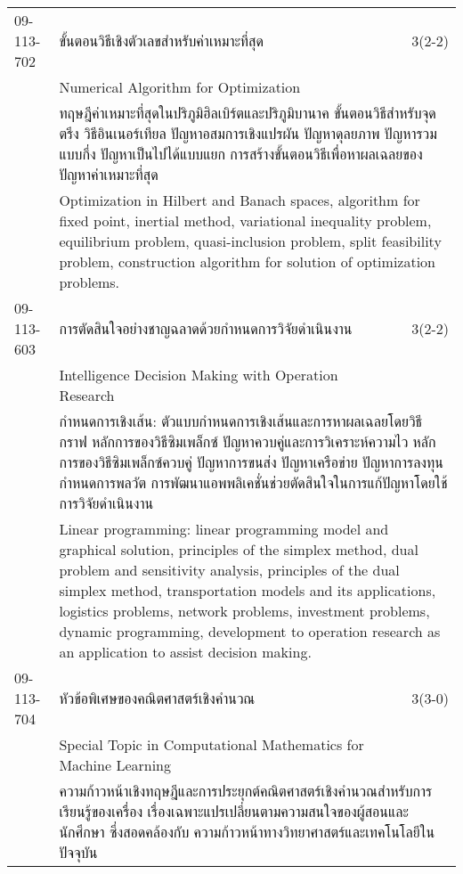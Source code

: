 \begin{longtable}{p{}p{}r{}}
09-113-702 & ขั้นตอนวิธีเชิงตัวเลขสำหรับค่าเหมาะที่สุด  & 3(2-2)\\*
 & Numerical Algorithm for Optimization & \phantom{x} \vspace{3mm} \\*
&  \multicolumn{2}{p{0.75\textwidth}}{ทฤษฎีค่าเหมาะที่สุดในปริภูมิฮิลเบิร์ตและปริภูมิบานาค ขั้นตอนวิธีสำหรับจุดตรึง วิธีอินเนอร์เทียล ปัญหาอสมการเชิงแปรผัน ปัญหาดุลยภาพ ปัญหารวมแบบกึ่ง ปัญหาเป็นไปได้แบบแยก การสร้างขั้นตอนวิธีเพื่อหาผลเฉลยของปัญหาค่าเหมาะที่สุด} \vspace{3mm} \\*
&  \multicolumn{2}{p{0.75\textwidth}}{Optimization in Hilbert and Banach spaces, algorithm for fixed point, inertial method, variational inequality problem, equilibrium problem, quasi-inclusion problem, split feasibility problem, construction algorithm for solution of optimization problems.} \vspace{8mm} \\*
09-113-603 & การตัดสินใจอย่างชาญฉลาดด้วยกำหนดการวิจัยดำเนินงาน & 3(2-2)\\*
 & Intelligence Decision Making with Operation Research & \phantom{x} \vspace{3mm} \\*
&  \multicolumn{2}{p{0.75\textwidth}}{กำหนดการเชิงเส้น: ตัวแบบกำหนดการเชิงเส้นและการหาผลเฉลยโดยวิธีกราฟ หลักการของวิธีซิมเพล็กซ์ ปัญหาควบคู่และการวิเคราะห์ความไว หลักการของวิธีซิมเพล็กซ์ควบคู่ ปัญหาการขนส่ง ปัญหาเครือข่าย ปัญหาการลงทุน กำหนดการพลวัต การพัฒนาแอพพลิเคชั่นช่วยตัดสินใจในการแก้ปัญหาโดยใช้การวิจัยดำเนินงาน} \vspace{3mm} \\*
&  \multicolumn{2}{p{0.75\textwidth}}{Linear programming: linear programming model and graphical solution, principles of the simplex method, dual problem and sensitivity analysis, principles of the dual simplex method, transportation models and its applications, logistics problems, network problems, investment problems, dynamic programming, development to operation research as an application to assist decision making.} \vspace{8mm} \\*
09-113-704 & หัวข้อพิเศษของคณิตศาสตร์เชิงคำนวณ  & 3(3-0)\\*
 & Special Topic in Computational Mathematics for Machine Learning & \phantom{x} \vspace{3mm} \\*
&  \multicolumn{2}{p{0.75\textwidth}}{ความก้าวหน้าเชิงทฤษฎีและการประยุกต์คณิตศาสตร์เชิงคำนวณสำหรับการเรียนรู้ของเครื่อง เรื่องเฉพาะแปรเปลี่ยนตามความสนใจของผู้สอนและนักศึกษา ซึ่งสอดคล้องกับ ความก้าวหน้าทางวิทยาศาสตร์และเทคโนโลยีในปัจจุบัน} \vspace{3mm} \\*

\end{longtable}
